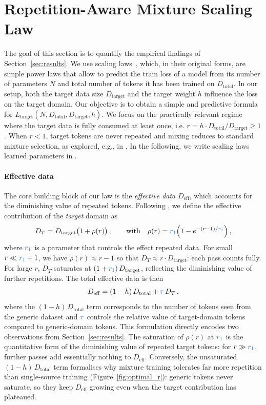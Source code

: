 \section{Repetition-Aware Mixture Scaling Law}
\label{sec:scaling_law}

The goal of this section is to quantify the empirical findings of Section~\ref{sec:results}.
We use scaling laws~\citep{kaplan2020scaling}, which, in their original forms, are simple power laws that allow to predict the train loss of a model from its number of parameters $N$ and total number of tokens it has been trained on $D_\text{total}$.
In our setup, both the target data size $D_\text{target}$ and the target weight $h$ influence the loss on the target domain. 
Our objective is to obtain a simple and predictive formula for $L_\text{target}(N, D_\text{total},  D_\text{target}, h)$.
We focus on the practically relevant regime where the target data is fully consumed at least once, i.e. $r = h \cdot D_\text{total} / D_\text{target} \ge 1$.
When $r < 1$, target tokens are never repeated and mixing reduces to standard mixture selection, as explored, e.g., in \citep{shukor2025scalinglawsoptimaldata}. In the following, we write scaling laws learned parameters in .

\paragraph{Effective data} 
The core building block of our law is the \emph{effective data} $D_{\mathrm{eff}}$, which accounts for the diminishing value of repeated tokens.
Following \citet{muennighoff2023scaling}, we define the effective contribution of the \emph{target} domain as
\begin{equation}\label{eq:rho}
  D_T = D_\text{target}\bigl(1 + \rho(r)\bigr)\,,
  \qquad \text{with} \quad
  \rho(r) = \pp{r_1}\!\left(1 - e^{-(r-1)/\pp{r_1}}\right),
\end{equation}
where $\pp{r_1}$ is a parameter that controls the effect repeated data.
For small $r \ll \pp{r_1} + 1$, we have $\rho(r) \approx r - 1$ so that $D_T \approx r \cdot D_\text{target}$: each pass counts fully.
For large $r$, $D_T$ saturates at $(1 + \pp{r_1})\,D_\text{target}$, reflecting the diminishing value of further repetitions.
The total effective data is then
\begin{equation}\label{eq:deff}
  D_{\mathrm{eff}} = (1-h)\,D_\text{total} + \pp{\tau}\,D_T\,,
\end{equation}
where the  $(1-h)\,D_\text{total}$ term corresponds to the number of tokens seen from the generic dataset and $\pp{\tau}$ controls the relative value of target-domain tokens compared to generic-domain tokens.
This formulation directly encodes two observations from Section~\ref{sec:results}. The saturation of $\rho(r)$ at $\pp{r_1}$ is the quantitative form of the diminishing value of repeated target tokens: for $r \gg \pp{r_1}$, further passes add essentially nothing to $D_\mathrm{eff}$. Conversely, the unsaturated $(1-h)\,D_\text{total}$ term formalises why mixture training tolerates far more repetition than single-source training (Figure~\ref{fig:optimal_r}): generic tokens never saturate, so they keep $D_\mathrm{eff}$ growing even when the target contribution has plateaued.

